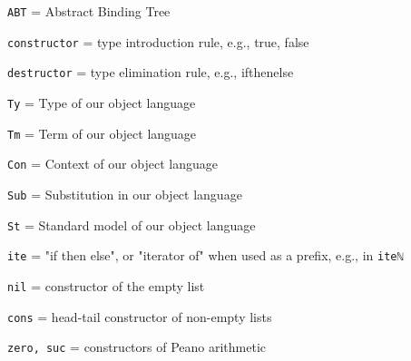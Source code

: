 \verb$ABT$ = Abstract Binding Tree

\verb$constructor$ = type introduction rule, e.g., true, false

\verb$destructor$ = type elimination rule, e.g., if\textunderscore then\textunderscore else\textunderscore

\verb$Ty$ = Type of our object language

\verb$Tm$ = Term of our object language

\verb$Con$ = Context of our object language

\verb$Sub$ = Substitution in our object language

\verb$St$ = Standard model of our object language

\verb$ite$ = "if then else", or "iterator of" when used as a prefix, e.g., in \verb$iteℕ$

\verb$nil$ = constructor of the empty list

\verb$cons$ = head-tail constructor of non-empty lists

\verb$zero, suc$ = constructors of Peano arithmetic

